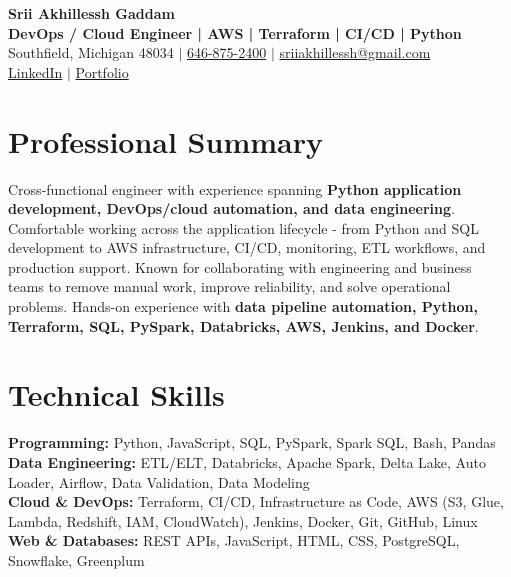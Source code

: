 \documentclass[letterpaper,10pt]{article}
\begin{document}
\fontsize{9.35pt}{10.45pt}\selectfont

\begin{center}
    {\LARGE \textbf{Srii Akhillessh Gaddam}} \\[-1pt]
    \textbf{DevOps / Cloud Engineer | AWS | Terraform | CI/CD | Python} \\[2pt]
    Southfield, Michigan 48034 $|$
    \href{tel:6468752400}{646-875-2400} $|$
    \href{mailto:sriiakhillessh@gmail.com}{sriiakhillessh@gmail.com} \\[1pt]
    \href{https://www.linkedin.com/in/srii-akhiilessh-gaddam-b48668191/}{LinkedIn} $|$
    \href{https://sriiakhillesshg.github.io/portfolio/}{Portfolio}
\end{center}
\vspace{-8pt}

\section{Professional Summary}
\small{Cross-functional engineer with experience spanning \textbf{Python application development, DevOps/cloud automation, and data engineering}. Comfortable working across the application lifecycle - from Python and SQL development to AWS infrastructure, CI/CD, monitoring, ETL workflows, and production support. Known for collaborating with engineering and business teams to remove manual work, improve reliability, and solve operational problems. Hands-on experience with \textbf{data pipeline automation, Python, Terraform, SQL, PySpark, Databricks, AWS, Jenkins, and Docker}.}

\section{Technical Skills}
\small{
\textbf{Programming:} Python, JavaScript, SQL, PySpark, Spark SQL, Bash, Pandas \\
\textbf{Data Engineering:} ETL/ELT, Databricks, Apache Spark, Delta Lake, Auto Loader, Airflow, Data Validation, Data Modeling \\
\textbf{Cloud \& DevOps:} Terraform, CI/CD, Infrastructure as Code, AWS (S3, Glue, Lambda, Redshift, IAM, CloudWatch), Jenkins, Docker, Git, GitHub, Linux \\
\textbf{Web \& Databases:} REST APIs, JavaScript, HTML, CSS, PostgreSQL, Snowflake, Greenplum
}
\end{document}

